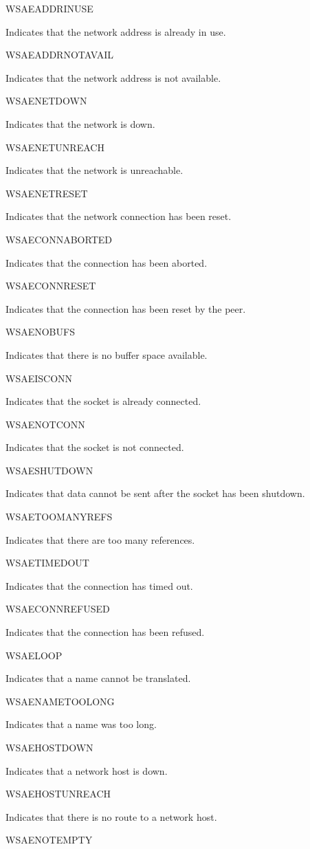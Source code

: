 WSAEADDRINUSE

Indicates that the network address is already in use.

WSAEADDRNOTAVAIL

Indicates that the network address is not available.

WSAENETDOWN

Indicates that the network is down.

WSAENETUNREACH

Indicates that the network is unreachable.

WSAENETRESET

Indicates that the network connection has been reset.

WSAECONNABORTED

Indicates that the connection has been aborted.

WSAECONNRESET

Indicates that the connection has been reset by the peer.

WSAENOBUFS

Indicates that there is no buffer space available.

WSAEISCONN

Indicates that the socket is already connected.

WSAENOTCONN

Indicates that the socket is not connected.

WSAESHUTDOWN

Indicates that data cannot be sent after the socket has been shutdown.

WSAETOOMANYREFS

Indicates that there are too many references.

WSAETIMEDOUT

Indicates that the connection has timed out.

WSAECONNREFUSED

Indicates that the connection has been refused.

WSAELOOP

Indicates that a name cannot be translated.

WSAENAMETOOLONG

Indicates that a name was too long.

WSAEHOSTDOWN

Indicates that a network host is down.

WSAEHOSTUNREACH

Indicates that there is no route to a network host.

WSAENOTEMPTY

